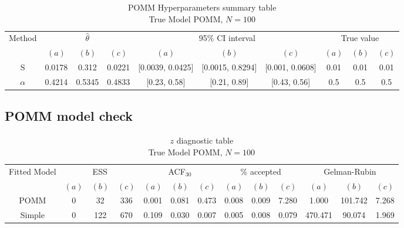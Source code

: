 \documentclass[11pt]{amsart}
\begin{document}
\begin{table}[htbp]
\centering
\caption*{
{\large POMM Hyperparameters summary table} \\ 
{\small True Model POMM, $N=100$}
} 
\begin{tabular}{cccccccccc}
\toprule
\multirow{2}{*}{Method} & \multicolumn{3}{c}{
$\hat{\theta}$} & \multicolumn{3}{c}{
95$\%$ CI interval} & \multicolumn{3}{c}{True value} \\
\cmidrule(lr){2-4} \cmidrule(lr){5-7} \cmidrule(lr){8-10}
& $(a)$ & $(b)$ & $(c)$ & $(a)$ & $(b)$ & $(c)$ & $(a)$ & $(b)$ & $(c)$ \\
\midrule
S  &0.0178 & 0.312 & 0.0221 & [0.0039,	0.0425] & [0.0015,	0.8294] & [0.001,	0.0608] & 0.01 & 0.01 & 0.01   \\
$\alpha$ & 0.4214 & 0.5345 & 0.4833 & [0.23,	0.58] & [0.21,	0.89] & [0.43,	0.56] & 0.5 & 0.5 & 0.5 \\
\bottomrule
\end{tabular}
\label{table:simulations_from_simple}
\end{table}


\subsection{POMM model check}



\begin{table}[htbp]
\centering
\caption*{
{\large $z$ diagnostic table} \\ 
{\small True Model POMM, $N=100$}
} 
\begin{tabular}{ccccccccccccc}
\toprule
\multirow{2}{*}{Fitted Model} & \multicolumn{3}{c}{ESS} & \multicolumn{3}{c}{
ACF$_{30}$} & \multicolumn{3}{c}{$\%$ accepted} & \multicolumn{3}{c}{Gelman-Rubin}\\
\cmidrule(lr){2-4} \cmidrule(lr){5-7} \cmidrule(lr){8-10} \cmidrule(lr){11-13} 
& $(a)$ & $(b)$ & $(c)$ & $(a)$ & $(b)$ & $(c)$ & $(a)$ & $(b)$ & $(c)$ & $(a)$ & $(b)$ & $(c)$ \\
\midrule
POMM &0 & 32 & 336 & 0.001 & 0.081 & 0.473 & 0.008 & 0.009 & 7.280 & 1.000 & 101.742 & 7.268   \\
Simple &0 & 122 & 670 & 0.109 & 0.030 & 0.007 & 0.005  & 0.008 & 0.079 & 470.471 & 90.074 & 1.969 \\
\bottomrule
\end{tabular}
\label{table:simulations_from_simple}
\end{table}
\end{document}
